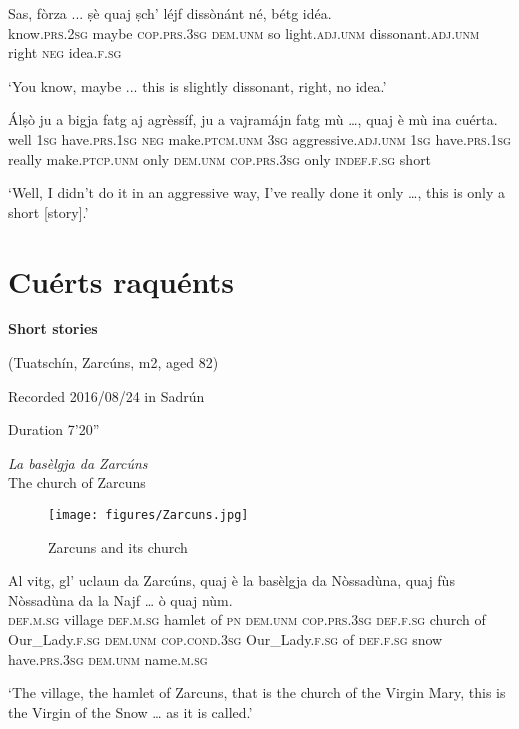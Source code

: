 \begin{linenumbers}
\gll  Sas, fòrza ... ṣè quaj ṣch’ léjf dissònánt né, bétg idéa.\\
 know.\textsc{prs.2sg} maybe {} \textsc{cop.prs.3sg} \textsc{dem.unm} so light.\textsc{adj.unm}  dissonant.\textsc{adj.unm} right \textsc{neg} idea.\textsc{f.sg}\\
\end{linenumbers}
\medskip
\glt `You know, maybe ... this is slightly dissonant, right, no idea.'
\medskip

\begin{linenumbers}
\gll  Álṣò ju a bigja fatg aj agrèssíf, ju a vajramájn fatg mù …, quaj è mù ina cuérta.  \\
well \textsc{1sg} have.\textsc{prs.1sg} \textsc{neg} make.\textsc{ptcm.unm} \textsc{3sg} aggressive.\textsc{adj.unm} \textsc{1sg} have.\textsc{prs.1sg} really make.\textsc{ptcp.unm} only {} \textsc{dem.unm} \textsc{cop.prs.3sg} only \textsc{indef.f.sg} short \\
\end{linenumbers}
\medskip
\glt `Well, I didn’t do it in an aggressive way, I’ve really done it only …, this is only a short [story].'
\medskip

\section{Cuérts raquénts}\label{sec:8.13}
\textbf{Short stories}

\noindent
(Tuatschín, Zarcúns, m2, aged 82)

\noindent
Recorded 2016/08/24 in Sadrún

\noindent
Duration 7'20''

\bigskip

\textit{La basèlgja da Zarcúns}\\
The church of Zarcuns\\
\medskip

\begin{figure}
	\texttt{[image: figures/Zarcuns.jpg]}
	\caption{Zarcuns and its church}
\end{figure}


\begin{linenumbers}
\gll Al vitg, gl’ uclaun da Zarcúns, quaj è la basèlgja da Nòssadùna, quaj fùs Nòssadùna da la Najf … ò quaj nùm.\\
 \textsc{def.m.sg} village \textsc{def.m.sg} hamlet of \textsc{pn} \textsc{dem.unm}  \textsc{cop.prs.3sg} \textsc{def.f.sg} church of Our\_Lady.\textsc{f.sg} \textsc{dem.unm} \textsc{cop.cond.3sg} Our\_Lady.\textsc{f.sg} of  \textsc{def.f.sg} snow {} have.\textsc{prs.3sg} \textsc{dem.unm} name.\textsc{m.sg} \\
\end{linenumbers}
\medskip
\glt `The village, the hamlet of Zarcuns, that is the church of the Virgin Mary, this is the Virgin of the Snow … as it is called.'
\medskip

